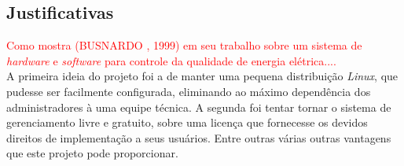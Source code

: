 \documentclass[a4paper, 12pt]{article}
\begin{document}
\subsection{Justificativas}
\indent\indent \textcolor{red}{Como mostra (BUSNARDO , 1999) em seu trabalho sobre um sistema de \textit{hardware} e \textit{software} para controle da qualidade de energia elétrica....}
\\
\indent A primeira ideia do projeto foi a de manter uma pequena distribuição \textit{Linux}, que pudesse ser facilmente configurada, eliminando ao máximo dependência 
dos administradores à uma equipe técnica. A segunda foi tentar tornar o sistema de gerenciamento livre e gratuito, sobre uma licença que fornecesse 
os devidos direitos de implementação a seus usuários. Entre outras várias outras vantagens que este projeto pode proporcionar.
\end{document}

